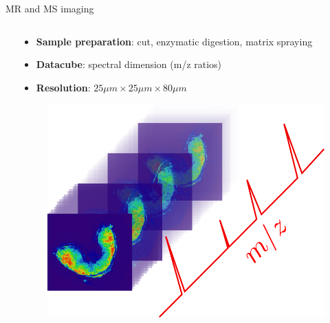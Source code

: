 \documentclass[10pt]{beamer}
\begin{document}
\begin{frame}{MR and MS imaging}
\begin{columns}
\begin{column}[t]{.5\textwidth}
    \end{column}
    \begin{column}[t]{.5\textwidth}
      \begin{itemize}
      \item \textbf{Sample preparation}: cut, enzymatic digestion, matrix spraying
      \item \textbf{Datacube}: spectral dimension (m/z ratios)
      \item \textbf{Resolution}: $25 \mu m \times 25 \mu m \times 80 \mu m$
      \end{itemize}
      \begin{figure}[ht]
        \centering
        \includegraphics[width=0.5\linewidth]{fig/maldi_cube}
      \end{figure}
    \end{column}
  \end{columns}
\end{frame}








  
\end{document}
